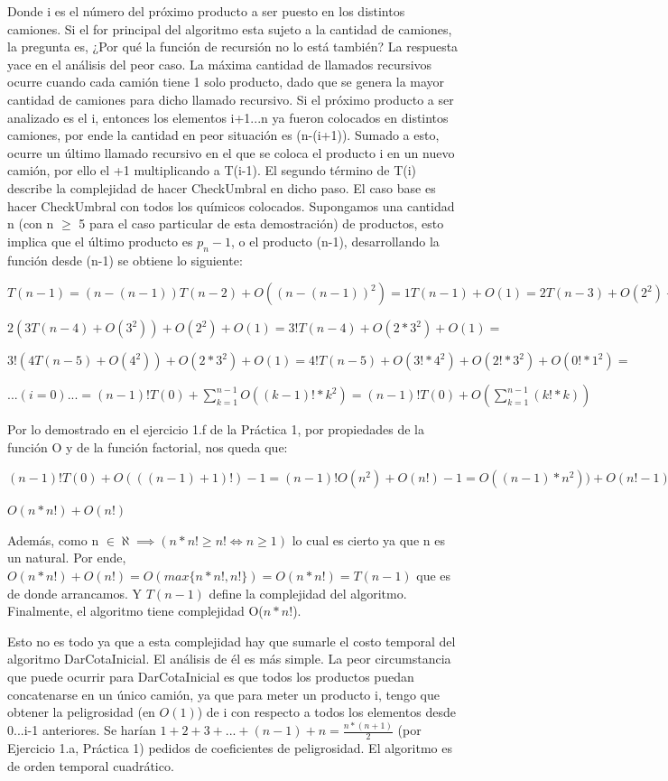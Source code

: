 \documentclass[10pt,a4paper]{article}
\begin{document}
Donde i es el número del próximo producto a ser puesto en los distintos camiones. Si el for principal del algoritmo esta sujeto a la cantidad de camiones, la pregunta es, ¿Por qué la función de recursión no lo está también? La respuesta yace en el análisis del peor caso. La máxima cantidad de llamados recursivos ocurre cuando cada camión tiene 1 solo producto, dado que se genera la mayor cantidad de camiones para dicho llamado recursivo. Si el próximo producto a ser analizado es el i, entonces los elementos i+1...n ya fueron colocados en distintos camiones, por ende la cantidad en peor situación es (n-(i+1)). Sumado a esto, ocurre un último llamado recursivo en el que se coloca el producto i en un nuevo camión, por ello el +1 multiplicando a T(i-1). El segundo término de T(i) describe la complejidad de hacer CheckUmbral en dicho paso. El caso base es hacer CheckUmbral con todos los químicos colocados.\newline
\indent Supongamos una cantidad n (con n $\geq$ 5 para el caso particular de esta demostración) de productos, esto implica que el último producto es $p_n-1$, o el producto (n-1), desarrollando la función desde (n-1) se obtiene lo siguiente:

$T(n-1) = (n-(n-1))T(n-2) + O((n-(n-1))^2) = 1T(n-1) + O(1) = 2T(n-3) + O(2^2) + O(1) = $

$2(3T(n-4) + O(3^2)) + O(2^2) + O(1) = 3!T(n-4) + O(2*3^2) + O(1) = $

$3!(4T(n-5) + O(4^2)) + O(2*3^2) + O(1) = 4!T(n-5) + O(3!*4^2) + O(2!*3^2) + O(0!*1^2) =$

$...(i = 0)... = (n-1)!T(0) + \sum\limits_{k=1}^{n-1} O((k-1)!*k^2) = (n-1)!T(0) + O(\sum\limits_{k=1}^{n-1} (k!*k))$

Por lo demostrado en el ejercicio 1.f de la Práctica 1, por propiedades de la función O y de la función factorial, nos queda que:

$(n-1)!T(0) + O(((n-1)+1)!) - 1 = (n-1)!O(n^2) + O(n!) - 1 = O((n-1)*n^2)) + O(n! - 1) =$

$O(n*n!) + O(n!)$

Además, como n $\in \aleph \implies ( n*n! \geq n! \iff n \geq 1)$ lo cual es cierto ya que n es un natural.
Por ende, $O(n*n!) + O(n!) = O(max\{n*n!,n!\}) = O(n*n!) = T(n-1)$ que es de donde arrancamos. Y $T(n-1)$ define la complejidad del algoritmo. Finalmente, el algoritmo tiene complejidad O($n*n!$). 

Esto no es todo ya que a esta complejidad hay que sumarle el costo temporal del algoritmo Dar\textunderscore Cota\textunderscore Inicial. El análisis de él es más simple. La peor circumstancia que puede ocurrir para Dar\textunderscore Cota\textunderscore Inicial es que todos los productos puedan concatenarse en un único camión, ya que para meter un producto i, tengo que obtener la peligrosidad (en $O(1)$) de i con respecto a todos los elementos desde 0...i-1 anteriores. Se harían $1 + 2 + 3 + ... + (n-1) + n = \frac{n * (n+1)}{2}$ (por Ejercicio 1.a, Práctica 1) pedidos de coeficientes de peligrosidad. El algoritmo es de orden temporal cuadrático.
\end{document}
